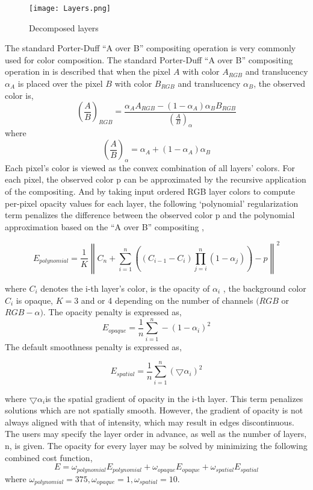 \begin{figure}[H]
	\centering
	\texttt{[image: Layers.png]}
	\caption{Decomposed layers }
	\label{decom:4layers}
\end{figure}
The standard Porter-Duff “A over B” compositing operation is very commonly used for color composition.
The standard Porter-Duff “A over B” compositing operation in \cite{porter1984compositing} is described that when the pixel $A$ with color $A_{RGB}$ and translucency $\alpha_{A}$ is placed over the pixel $B$ with color $B_{RGB}$ and translucency $\alpha_{B}$, the observed color is, \\
\begin{equation} \label{eq:aoverb}
  \left ( \frac{A}{B} \right )_{RGB}=\frac{\alpha_{A}A_{RGB}-(1-\alpha_{A})\alpha_{B}B_{RGB}}{\left ( \frac{A}{B} \right )_{\alpha}} 
\end{equation} 
where 
\[\left ( \frac{A}{B} \right )_{\alpha} = \alpha_{A}+(1-\alpha_{A})\alpha_{B} \]
Each pixel’s color is viewed as the convex combination of all layers’ colors. For each pixel, the observed color p can be approximated by the recursive application of the compositing. And by taking input ordered RGB layer colors to compute per-pixel opacity values for each layer, the following ‘polynomial’ regularization term penalizes the difference between the observed color p and the polynomial approximation based on the “A over B” compositing \cite{porter1984compositing},

\[E_{polynomial}=\frac{1}{K}\left \|    C_{n}+\sum_{i=1}^{n}  \left ( \left ( C_{i-1}-C_{i} \right ) \prod_{j=i}^{n}(1-\alpha_{j}) \right )-p  \right \|^{2}\]

where $C_{i}$ denotes the i-th layer’s color, is the opacity of $\alpha_{i}$ , the background color $C_{i}$ is opaque, $K=3$ and or 4 depending on the number of channels $(RGB$ or $RGB-\alpha)$. The opacity penalty is expressed as,
\[E_{opaque}=\frac{1}{n}\sum_{i=1}^n-(1-\alpha_{i})^2\]
The default smoothness penalty is expressed as,

\[E_{spatial}=\frac{1}{n}\sum_{i=1}^n( \bigtriangledown  \alpha_{i})^2\]

where $ \bigtriangledown  \alpha_{i}$is the spatial gradient of opacity in the i-th layer. This term penalizes solutions which are not spatially smooth. However, the gradient of opacity is not always aligned with that of intensity, which may result in edges discontinuous.
The users may specify the layer order in advance, as well as the number of layers, n, is given. The opacity for every layer may be solved by minimizing the following combined cost function,
\begin{equation}
E=\omega_{polynomial}E_{polynomial}+\omega_{opaque}E_{opaque}+\omega_{spatial}E_{spatial}
\label{eq:layer1}
\end{equation} 
where $\omega_{polynomial} = 375 ,\omega_{opaque}=1 , \omega_{spatial}=10$. 

